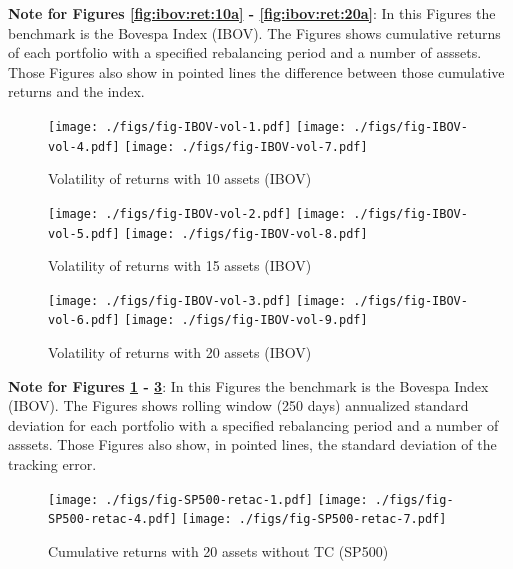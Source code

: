 \documentclass[preprint,authoryear,review,12pt]{elsarticle}
\begin{document}
{\footnotesize
\textbf{Note for Figures \ref{fig:ibov:ret:10a} - \ref{fig:ibov:ret:20a}}:
In this Figures the benchmark is the Bovespa Index (IBOV).
The Figures shows cumulative returns of each portfolio with a specified rebalancing period and a number of asssets.
Those Figures also show in pointed lines the difference between those cumulative returns and the index.}


\begin{figure}[htpb]
\centering
\caption{Volatility of returns with 10 assets (IBOV)}
\label{fig:ibov:vol:10a}
\texttt{[image: ./figs/fig-IBOV-vol-1.pdf]}
\texttt{[image: ./figs/fig-IBOV-vol-4.pdf]}
\texttt{[image: ./figs/fig-IBOV-vol-7.pdf]}
\end{figure}

\begin{figure}[htpb]
\centering
\caption{Volatility of returns with 15 assets (IBOV)}
\label{fig:ibov:vol:15a}
\texttt{[image: ./figs/fig-IBOV-vol-2.pdf]}
\texttt{[image: ./figs/fig-IBOV-vol-5.pdf]}
\texttt{[image: ./figs/fig-IBOV-vol-8.pdf]}
\end{figure}

\begin{figure}[htpb]
\centering
\caption{Volatility of returns with 20 assets (IBOV)}
\label{fig:ibov:vol:20a}
\texttt{[image: ./figs/fig-IBOV-vol-3.pdf]}
\texttt{[image: ./figs/fig-IBOV-vol-6.pdf]}
\texttt{[image: ./figs/fig-IBOV-vol-9.pdf]}
\end{figure}

{\footnotesize
\textbf{Note for Figures \ref{fig:ibov:vol:10a} - \ref{fig:ibov:vol:20a}}:
In this Figures the benchmark is the Bovespa Index (IBOV).
The Figures shows rolling window (250 days) annualized standard deviation for each portfolio with a specified rebalancing period and a number of asssets.
Those Figures also show, in pointed lines, the standard deviation of the tracking error.}


\begin{figure}[htpb]
\centering
\caption{Cumulative returns with 20 assets without TC (SP500)}
\label{fig:sp500:ret:20a}
\texttt{[image: ./figs/fig-SP500-retac-1.pdf]}
\texttt{[image: ./figs/fig-SP500-retac-4.pdf]}
\texttt{[image: ./figs/fig-SP500-retac-7.pdf]}

\end{figure}
\end{document}
